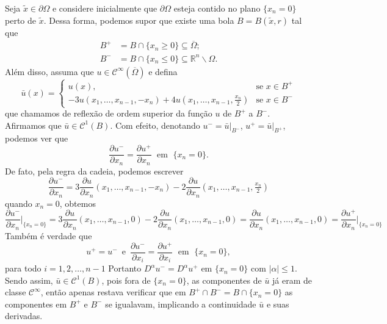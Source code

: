 \documentclass[a4paper, 11pt]{book}
\theoremstyle{definition}
\newcommand{\bR}{\mathbb{R}}
\newcommand{\cC}{\mathcal{C}}
\begin{document}
\begin{prf}
    Seja $\tilde x \in \partial\Omega$ e considere inicialmente que $\partial\Omega$ esteja contido no plano $\{x_n = 0\}$ perto de $\tilde x$.
    Dessa forma, podemos supor que existe uma bola $B = B(\tilde x, r)$ tal que
    \begin{equation} \label{eq:reflexao}
        \begin{aligned}
            B^+ &= B \cap \{x_n \geqslant 0\} \subseteq \overline\Omega;\\
            B^- &= B \cap \{x_n \leqslant 0\} \subseteq \bR^n \smallsetminus \Omega.
        \end{aligned}
    \end{equation}
    Além disso, assuma que $u \in \cC^\infty(\overline\Omega)$ e defina
    \[
        \bar u(x) =
        \left\{ 
            \begin{array}{ll}
                u(x), & \text{se } x\in B^+\\
                -3u(x_1,\dots,x_{n-1}, -x_n) + 4u(x_1,\dots,x_{n-1},\frac{x_n}{2}) & \text{se } x \in B^-
            \end{array}
        \right.
    \]
    que chamamos de reflexão de ordem superior da função $u$ de $B^+$ a $B^-$.
    Afirmamos que $\bar u \in \cC^1(B)$.
    Com efeito, denotando $u^- = \bar u \big|_{B^-}$, $u^+ = \bar u \big|_{B^+}$, podemos ver que
    \[
        \dfrac{\partial u^-}{\partial x_n} = \dfrac{\partial u^+}{\partial x_n} \;\text{ em }\; \{x_n = 0\}.
    \]
    De fato, pela regra da cadeia, podemos escrever
    \[
        \dfrac{\partial u^-}{\partial x_n} = 3 \frac{\partial u}{\partial x_n}(x_1,\dots,x_{n-1}, -x_n)  - 2\frac{\partial u}{\partial x_n}(x_1,\dots,x_{n-1},\tfrac{x_n}{2})
    \]
    quando $x_n = 0$, obtemos
    \[
        \dfrac{\partial u^-}{\partial x_n} \Bigg|_{\{x_n = 0\}} = 3\frac{\partial u}{\partial x_n}(x_1,\dots,x_{n-1},0) - 2\frac{\partial u}{\partial x_n}(x_1,\dots,x_{n-1},0) = \frac{\partial u}{\partial x_n}(x_1,\dots,x_{n-1},0) = \dfrac{\partial u^+}{\partial x_n} \Bigg|_{\{x_n =0\}}
    \]
    Também é verdade que
    \[
        u^+ = u^- \,\text{ e }\, \dfrac{\partial u^-}{\partial x_i} = \dfrac{\partial u^+}{\partial x_i}  \;\text{ em }\; \{x_n = 0\},
    \]
    para todo $i = 1,2,\dots,n-1$ Portanto $D^\alpha u^- = D^\alpha u^+$ em $\{x_n = 0\}$ com $|\alpha| \leqslant 1$. Sendo assim, $\bar u \in \cC^1 (B)$, pois fora de $\{x_n = 0\}$, as componentes de $\bar u$ já eram de classe $\cC^\infty$, então apenas restava verificar que em $B^+ \cap B^- = B \cap \{x_n = 0\}$ as componentes em $B^+$ e $B^-$ se igualavam, implicando a continuidade $\bar u$ e suas derivadas.


\end{prf}
\end{document}
